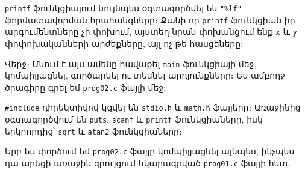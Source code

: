 \begin{Shaded}
\begin{Highlighting}[]
\NormalTok{ );}
\end{Highlighting}
\end{Shaded}

\texttt{printf} ֆունկցիայում նույնպես օգտագործվել են \texttt{"\%lf"}
ֆորմատավորման հրահանգները։ Քանի որ \texttt{printf} ֆունկցիան իր
արգումենտները չի փոխում, այստեղ նրան փոխանցում ենք \texttt{x} և
\texttt{y} փոփոխականների արժեքները, այլ ոչ թե հասցեները։

Վերջ։ Մնում է այս ամենը հավաքել \texttt{main} ֆունկցիայի մեջ,
կոմպիլյացնել, գործարկել ու տեսնել արդյունքները։ Ես ամբողջ ծրագիրը գրել
եմ \texttt{prog02.c} ֆայլի մեջ։

\begin{Shaded}
\begin{Highlighting}[]

\NormalTok{\{}
  \NormalTok{;}
\NormalTok{ );}


\NormalTok{ );}

   \NormalTok{;}
\NormalTok{\}}
\end{Highlighting}
\end{Shaded}

\texttt{\#include} դիրեկտիվով կցվել են \texttt{stdio.h} և
\texttt{math.h} ֆայլերը։ Առաջինից օգտագործվում են \texttt{puts},
\texttt{scanf} և \texttt{printf} ֆունկցիաները, իսկ երկրորդից՝
\texttt{sqrt} և \texttt{atan2} ֆունկցիաները։

Երբ ես փորձում եմ \texttt{prog02.c} ֆայլը կոմպիլյացնել այնպես, ինչպես դա
արեցի առաջին զրույցում նկարագրված \texttt{prog01.c} ֆայլի հետ.

